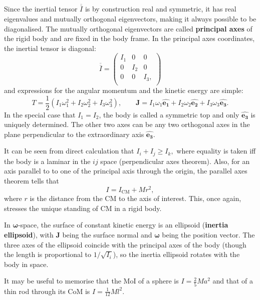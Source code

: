 \documentclass{article}
\begin{document}
Since the inertial tensor $\overline{\overline{I}} $ is by construction real and symmetric, it has real eigenvalues and mutually orthogonal eigenvectors, making it always possible to be diagonalised. The mutually orthogonal eigenvectors are called \textbf{principal axes} of the rigid body and are fixed in the body frame. In the principal axes coordinates, the inertial tensor is diagonal:
\[
    \overline{\overline{I}} = 
    \begin{pmatrix}
        I_1 & 0 &  0 \\
        0 & I_2 &  0 \\
        0 & 0 &  I_3, \\
    \end{pmatrix}
\]
and expressions for the angular momentum and the kinetic energy are simple:
\[
    T = \frac{1}{2} (I_1 \omega_1^2 + I_2 \omega_2^2 + I_3 \omega_3^2), 
    \qquad 
    \mathbf{J} = I_1 \omega_1 \hat{\mathbf{e_1} } + I_2 \omega_2 \hat{\mathbf{e_2} } + I_3 \omega_3 \hat{\mathbf{e_3} }.  
\]
In the special case that $I_1 = I_2$, the body is called a symmetric top and only $\hat{\mathbf{e_3} } $ is uniquely determined. The other two axes can be any two orthogonal axes in the plane perpendicular to the extraordinary axis $\hat{\mathbf{e_3} }.$

It can be seen from direct calculation that $I_i + I_j \geq I_k,$ where equality is taken iff the body is a laminar in the $ij$ space (perpendicular axes theorem). Also, for an axis parallel to to one of the principal axis through the origin, the parallel axes theorem tells that
\[
    \boxed{
        I = I_{\text{CM}} + M r^2,
    }
\]
where $r$ is the distance from the CM to the axis of interest. This, once again, stresses the unique standing of CM in a rigid body. 

In $\boldsymbol{\mathbf{\omega}}$-space, the surface of constant kinetic energy is an ellipsoid (\textbf{inertia ellipsoid}), with $\mathbf{J} $ being the surface normal and $\boldsymbol{\mathbf{\omega}}$ being the position vector. The three axes of the ellipsoid coincide with the principal axes of the body (though the length is proportional to $1/\sqrt{I_i}$), so the inertia ellipsoid rotates with the body in space. 

It may be useful to memorise that the MoI of a sphere is $I = \frac{2}{5} M a^{2} $ and that of a thin rod through its CoM is $I = \frac{1}{12} M l^2. $
\end{document}
